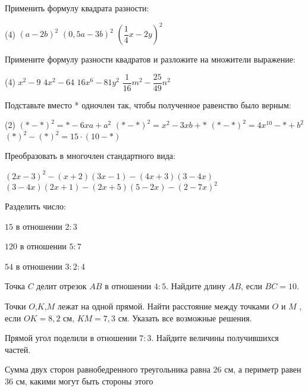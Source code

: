 \begin{class}[number=2]
	\begin{listofex}
		\item Применить формулу квадрата разности:
		\begin{tasks}(4)
			\task \( (a-2b)^2 \)
			\task \( (0,5a-3b)^2 \)
			\task \( \left( \dfrac{1}{4}x-2y \right)^2 \)
		\end{tasks}
		\item Примените формулу разности квадратов и разложите на множители выражение:
		\begin{tasks}(4)
			\task \( x^2-9 \)
			\task \( 4x^2-64 \)
			\task \( 16x^6-81y^2 \)
			\task \( \dfrac{1}{16}m^2-\dfrac{25}{49}n^2 \)
		\end{tasks}
		\item Подставьте вместо * одночлен так, чтобы полученное равенство было верным:
		\begin{tasks}(2)
			\task \( (*-*)^2=*-6xa+a^2 \)
			\task \( (*-*)^2=x^2-3xb+* \)
			\task \( (*-*)^2=4x^{10}-*+b^2 \)
			\task \( (*)^2-(*)^2= 15 \cdot (10-*) \)
		\end{tasks}
		\item Преобразовать в многочлен стандартного вида:
		\begin{itasks}[1]
			\task \( (2x-3)^2-(x+2)(3x-1)-(4x+3)(3-4x) \)
			\task \( (3-4x)(2x+1)-(2x+5)(5-2x)-(2-7x)^2 \)
		\end{itasks}
		\item Разделить число:
		\begin{enumcols}[itemcolumns=3]
			\item \( 15 \) в отношении \( 2:3 \)
			\item \( 120 \) в отношении \( 5:7 \)
			\item \( 54 \) в отношении \( 3:2:4 \)
		\end{enumcols}
		\item Точка \( C \) делит отрезок \( AB \) в отношении \( 4:5 \). Найдите длину \( AB \), если \( BC=10 \).
		\item Точки \( O \),\( K \),\( M \) лежат на одной прямой. Найти расстояние между
		точками \( O \) и \( M \) , если \( OK = 8,2 \) см, \( KM = 7,3 \) см. Указать все
		возможные решения.
		\item Прямой угол поделили в отношении \( 7:3 \). Найдите величины получившихся частей.
		\item Сумма двух сторон равнобедренного треугольника равна \( 26 \) см, а
		периметр равен \( 36 \) см, какими могут быть стороны этого

\end{listofex}
\end{class}
